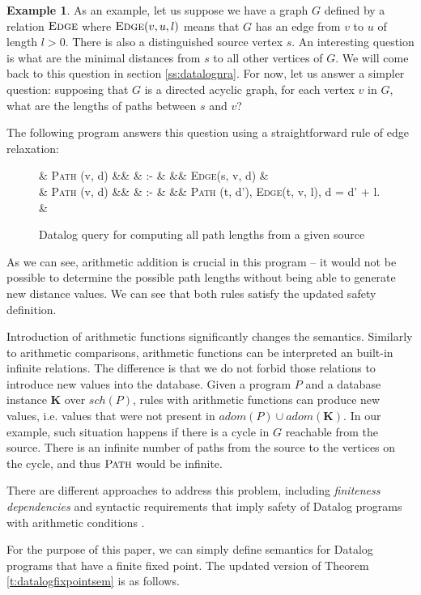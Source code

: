 \documentclass{pracamgr}
\theoremstyle{plain}
\theoremstyle{definition}
\newtheorem{exmp}{Example}[section]
\theoremstyle{remark}
\newcommand{\narrow}[1]{\begin{changemargin}{2cm}{2cm} #1 \end{changemargin}}
\newcommand{\relat}[2]{$\textsc{#1}#2$}
\newcommand{\dprog}[4]{
  \begin{figure}[h!]
    \narrow{
      #1
      \begin{flalign*}
      #2
      \end{flalign*}
      \caption{#3}
      \label{#4}
  }
\end{figure}

}
\begin{document}
\begin{exmp}

As an example, let us suppose we have a graph $G$ defined by a relation $\textsc{Edge}$ 
where \relat{Edge}{(v, u, l)} means that $G$ has an edge from $v$ to $u$ of length $l > 0$. 
There is also a distinguished source vertex $s$.
An interesting question is what are the minimal distances from $s$ to all other vertices of $G$.
We will come back to this question in section \ref{ss:datalognra}.
For now, let us answer a simpler question: supposing that $G$ is a directed acyclic graph, for each vertex $v$ in $G$,
what are the lengths of paths between $s$ and $v$?

The following program answers this question using a straightforward rule of edge relaxation:

\dprog{}{
  & \textsc{Path} (v, d) &&  & :- & && \textsc{Edge}(s, v, d) & \\
  & \textsc{Path} (v, d) &&  & :- & && \textsc{Path} (t, d'), \textsc{Edge}(t, v, l), d = d' + l. &\\
}{Datalog query for computing all path lengths from a given source}{ex:pathsdatalog}

As we can see, arithmetic addition is crucial in this program -- it would not be possible to determine the possible path lengths without being able to generate new distance values. We can see that both rules satisfy the updated safety definition.
\end{exmp}

Introduction of arithmetic functions significantly changes the semantics.
Similarly to arithmetic comparisons, arithmetic functions can be interpreted an built-in infinite relations. 
The difference is that we do not forbid those relations to introduce new values into the database.
Given a program $P$ and a database instance $\textbf{K}$ over $sch(P)$, rules with arithmetic functions can produce new values, i.e. values that were not present in $adom(P) \cup adom(\textbf{K})$. In our example, such situation happens if there is a cycle in $G$ reachable from the source. There is an infinite number of paths from the source to the vertices on the cycle, and thus $\textsc{Path}$ would be infinite.

There are different approaches to address this problem, including \emph{finiteness dependencies} and syntactic requirements that imply safety of Datalog programs with arithmetic conditions \cite{RBS87, KRS88a, KRS88b, SV89}.

For the purpose of this paper, we can simply define semantics for Datalog programs that have a finite fixed point. The updated version of Theorem \ref{t:datalogfixpointsem} is as follows.
\end{document}
